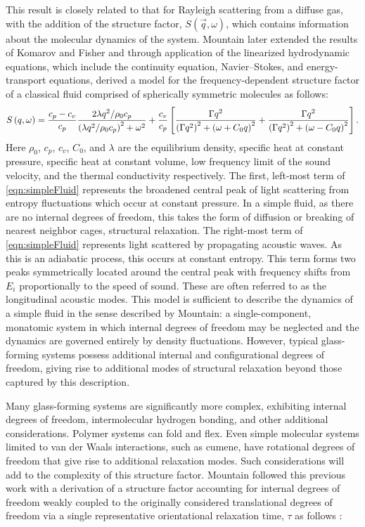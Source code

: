 This result is closely related to that for Rayleigh scattering from a diffuse gas, with the addition of the structure factor, $S\left(\vec{q},\omega \right)$, which contains information about the molecular dynamics of the system. Mountain later extended the results of Komarov and Fisher and through application of the linearized hydrodynamic equations, which include the continuity equation, Navier--Stokes, and energy-transport equations, derived a model for the frequency-dependent structure factor of a classical fluid comprised of spherically symmetric molecules as follows:
\begin{equation}
\centering
S\left(q,\omega \right )=\frac{c_p-c_v}{c_p}\frac{2\lambda q^2/\rho_0c_p}{\left(\lambda q^2/\rho_0c_p \right )^2+\omega^2}+\frac{c_v}{c_p}\left [ \frac{\Gamma q^2}{\left(\Gamma q^2 \right )^2+\left(\omega+C_0 q \right )^2}+ \frac{\Gamma q^2}{\left(\Gamma q^2 \right )^2+\left(\omega-C_0 q \right )^2}\right ].\label{eqn:simpleFluid}
\end{equation}
Here $\rho_0$, $c_p$, $c_v$, $C_0$, and $\lambda$ are the equilibrium density, specific heat at constant pressure, specific heat at constant volume, low frequency limit of the sound velocity, and the thermal conductivity respectively.\cite{Mountain2}  The first, left-most term of \eqn\nolinebreak \ref{eqn:simpleFluid} represents the broadened central peak of light scattering from entropy fluctuations which occur at constant pressure.  In a simple fluid, as there are no internal degrees of freedom, this takes the form of diffusion or breaking of nearest neighbor cages\textemdash \ie, structural relaxation.  The right-most term of \eqn\nolinebreak \ref{eqn:simpleFluid} represents light scattered by propagating acoustic waves.  As this is an adiabatic process, this occurs at constant entropy.  This term forms two peaks symmetrically located around the central peak with frequency shifts from $E_i$ proportionally to the speed of sound.  These are often referred to as the longitudinal acoustic modes.  This model is sufficient to describe the dynamics of a simple fluid in the sense described by Mountain: a single-component, monatomic system in which internal degrees of freedom may be neglected and the dynamics are governed entirely by density fluctuations. However, typical glass-forming systems possess additional internal and configurational degrees of freedom, giving rise to additional modes of structural relaxation beyond those captured by this description.

Many glass-forming systems are significantly more complex, exhibiting internal degrees of freedom, intermolecular hydrogen bonding, and other additional considerations.  Polymer systems can fold and flex.  Even simple molecular systems limited to van der Waals interactions, such as cumene, have rotational degrees of freedom that give rise to additional relaxation modes.  Such considerations will add to the complexity of this structure factor.  Mountain followed this previous work with a derivation of a structure factor accounting for internal degrees of freedom weakly coupled to the originally considered translational degrees of freedom via a single representative orientational relaxation time, $\tau$ as follows \cite{Mountain}: 

